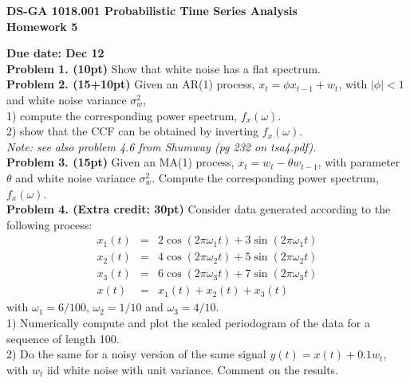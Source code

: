 \documentclass[12pt]{article}
\begin{document}
\thispagestyle{empty}
\begin{center}

\textbf{DS-GA 1018.001  Probabilistic Time Series Analysis \\
Homework 5}
\end{center}

\noindent \textbf{Due date: Dec 12}\\

\noindent \textbf{Problem 1. (10pt)} Show that white noise has a flat spectrum.\\

\noindent \textbf{Problem 2. (15+10pt)} Given an AR(1) process, $ x_t = \phi x_{t-1} + w_t$, with $|\phi|<1$ and white noise variance $\sigma_w^2$, \\
1) compute the corresponding power spectrum, $f_x(\omega)$.\\
2) show that the CCF can be obtained by inverting $f_x(\omega)$.\\
\emph{Note: see also problem 4.6 from Shumway (pg 232 on tsa4.pdf).}\\

\noindent \textbf{Problem 3. (15pt)} Given an MA(1) process, $ x_t = w_t - \theta w_{t-1}$, with parameter $\theta$ and white noise variance $\sigma_w^2$. Compute the corresponding power spectrum, $f_x(\omega)$. \\

\noindent \textbf{Problem 4. (Extra credit: 30pt)}  Consider  data generated according to the following process:
\begin{eqnarray}
x_1(t) & = &  2 \cos(2\pi \omega_1 t) + 3 \sin(2\pi \omega_1 t) \\
x_2(t) & = & 4 \cos(2\pi \omega_2 t) + 5 \sin(2\pi \omega_2 t) \\
 x_3(t) & = & 6 \cos(2\pi \omega_3 t) + 7\sin(2\pi \omega_3 t) \\
 x(t) &=& x_1(t) + x_2(t) + x_3(t)
\end{eqnarray}
with $\omega_1 = 6/100$, $\omega_2 = 1/10$ and  $\omega_3 = 4/10$. \\ 1) Numerically compute and plot the scaled periodogram of the data for a sequence of length 100. \\
2) Do the same for a noisy version of the same signal $y(t) = x(t) + 0.1 w_t$, with $w_t$  iid white noise with unit variance.
Comment on the results.
\end{document}
